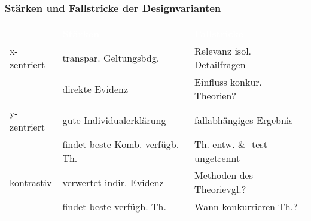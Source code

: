 \documentclass{beamer}
\begin{document}
\begin{frame}
\frametitle{Stärken und Fallstricke der Designvarianten}

\begin{adjustbox}{width = \textwidth}
\begin{tabular}{*{3}{l}}
\rowcolor{gray!75}\textcolor{white} ~ & \textbf{\textcolor{white}{Stärken}} & \textbf{\textcolor{white}{Fallstricke}} \\
x-zentriert                    & transpar. Geltungsbdg.          & Relevanz isol. Detailfragen\\
~                              & direkte Evidenz                 & Einfluss konkur. Theorien?\\
\rowcolor{gray!25} y-zentriert & gute Individualerklärung        & fallabhängiges Ergebnis\\
\rowcolor{gray!25} ~           & findet beste Komb. verfügb. Th. & Th.-entw. \& -test ungetrennt\\
kontrastiv                     & verwertet indir. Evidenz        & Methoden des Theorievgl.?\\
~                              & findet beste verfügb. Th.       & Wann konkurrieren Th.?\\
\end{tabular}
\end{adjustbox}



\end{frame}
\end{document}
